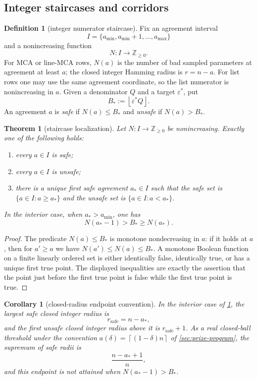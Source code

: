 \documentclass[11pt]{article}
\newtheorem{theorem}{Theorem}[section]
\newtheorem{corollary}[corollary]{Corollary}
\theoremstyle{definition}
\newtheorem{definition}[definition]{Definition}
\theoremstyle{remark}
\providecommand{\ceil}[1]{\left\lceil #1\right\rceil}
\providecommand{\floor}[1]{\left\lfloor #1\right\rfloor}
\begin{document}
\subsection{Integer staircases and corridors}

\begin{definition}[integer numerator staircase]\label{def:capf-staircase}
Fix an agreement interval
\[
        I=\{a_{\min},a_{\min}+1,\ldots,a_{\max}\}
\]
and a nonincreasing function
\[
        N:I\longrightarrow \mathbb Z_{\ge0}.
\]
For MCA or line-MCA rows, $N(a)$ is the number of bad sampled parameters at agreement at least $a$; the closed integer Hamming radius is $r=n-a$.  For list rows one may use the same agreement coordinate, so the list numerator is nonincreasing in $a$.  Given a denominator $Q$ and a target $\varepsilon^*$, put
\[
        B_*:=\floor{\varepsilon^* Q}.
\]
An agreement $a$ is \emph{safe} if $N(a)\le B_*$ and \emph{unsafe} if $N(a)>B_*$.
\end{definition}

\begin{theorem}[staircase localization]\label{thm:capf-staircase}
Let $N:I\to\mathbb Z_{\ge0}$ be nonincreasing.  Exactly one of the following holds:
\begin{enumerate}[label=\textup{(\roman*)}]
\item every $a\in I$ is safe;
\item every $a\in I$ is unsafe;
\item there is a unique first safe agreement $a_*\in I$ such that the safe set is $\{a\in I:a\ge a_*\}$ and the unsafe set is $\{a\in I:a<a_*\}$.
\end{enumerate}
In the interior case, when $a_*>a_{\min}$, one has
\[
        N(a_*-1)>B_*\ge N(a_*).
\]
\end{theorem}

\begin{proof}
The predicate $N(a)\le B_*$ is monotone nondecreasing in $a$: if it holds at $a$, then for $a'\ge a$ we have $N(a')\le N(a)\le B_*$.  A monotone Boolean function on a finite linearly ordered set is either identically false, identically true, or has a unique first true point.  The displayed inequalities are exactly the assertion that the point just before the first true point is false while the first true point is true.
\end{proof}

\begin{corollary}[closed-radius endpoint convention]\label{cor:capf-endpoint}
In the interior case of \cref{thm:capf-staircase}, the largest safe closed integer radius is
\[
        r_{\mathrm{safe}}=n-a_*,
\]
and the first unsafe closed integer radius above it is $r_{\mathrm{safe}}+1$.  As a real closed-ball threshold under the convention $a(\delta)=\ceil{(1-\delta)n}$ of \cref{sec:prize-program}, the supremum of safe radii is
\[
        \frac{n-a_*+1}{n},
\]
and this endpoint is not attained when $N(a_*-1)>B_*$.
\end{corollary}
\end{document}
